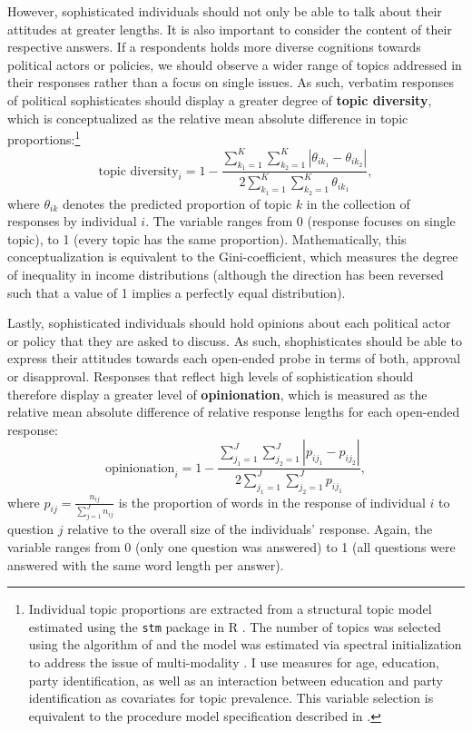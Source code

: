 \documentclass[12pt]{article}
\begin{document}
However, sophisticated individuals should not only be able to talk about their attitudes at greater lengths. It is also important to consider the content of their respective answers. If a respondents holds more diverse cognitions towards political actors or policies, we should observe a wider range of topics addressed in their responses rather than a focus on single issues. As such, verbatim responses of political sophisticates should display a greater degree of \textbf{topic diversity}, which is conceptualized as the relative mean absolute difference in topic proportions:\footnote{Individual topic proportions are extracted from a structural topic model estimated using the \texttt{stm} package in R \citep{roberts2014structural}. The number of topics was selected using the algorithm of \citet{lee2014low} and the model was estimated via spectral initialization to address the issue of multi-modality \citep[see][for details]{roberts2014stm}. I use measures for age, education, party identification, as well as an interaction between education and party identification as covariates for topic prevalence. This variable selection is equivalent to the procedure model specification described in \citet{roberts2014structural}. %
}
\begin{equation}
\text{topic diversity}_i = 1-\dfrac{\sum_{k_1=1}^K\sum_{k_2=1}^K |\theta_{ik_1} - \theta_{ik_2}|}{2\sum_{k_1=1}^K\sum_{k_2=1}^K \theta_{ik_1}},
\end{equation}
where $\theta_{ik}$ denotes the predicted proportion of topic $k$ in the collection of responses by individual $i$. The variable ranges from 0 (response focuses on single topic), to 1 (every topic has the same proportion). Mathematically, this conceptualization is equivalent to the Gini-coefficient, which measures the degree of inequality in income distributions (although the direction has been reversed such that a value of 1 implies a perfectly equal distribution).

Lastly, sophisticated individuals should hold opinions about each political actor or policy that they are asked to discuss. As such, shophisticates should be able to express their attitudes towards each open-ended probe in terms of both, approval or disapproval. Responses that reflect high levels of sophistication should therefore display a greater level of \textbf{opinionation}, which is measured as the relative mean absolute difference of relative response lengths for each open-ended response:
\begin{equation}
\text{opinionation}_i = 1-\dfrac{\sum_{j_1=1}^J\sum_{j_2=1}^J |p_{ij_1} - p_{ij_2}|}{2\sum_{j_1=1}^J\sum_{j_2=1}^J p_{ij_1}},
\end{equation}
where $p_{ij}=\tfrac{n_{ij}}{\sum_{j=1}^J n_{ij}}$ is the proportion of words in the response of individual $i$ to question $j$ relative to the overall size of the individuals' response. Again, the variable ranges from 0 (only one question was answered) to 1 (all questions were answered with the same word length per answer).
\end{document}

